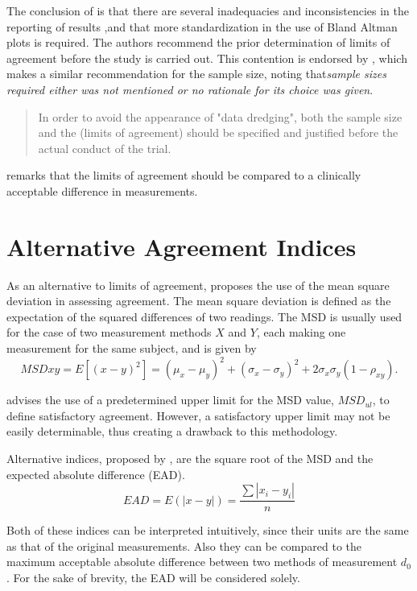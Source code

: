 \documentclass[12pt, a4paper]{report}
\theoremstyle{plain}
\theoremstyle{definition}
\theoremstyle{remark}
\begin{document}
	The conclusion of \citet{mantha} is that there are several
	inadequacies and inconsistencies in the reporting of results ,and
	that more standardization in the use of Bland Altman plots is
	required. The authors recommend the prior determination of limits
	of agreement before the study is carried out. This contention is
	endorsed by \citet{lin}, which makes a similar recommendation for
	the sample size, noting that\emph{sample sizes required either was
		not mentioned or no rationale for its choice was given}.
	
	\begin{quote}
		In order to avoid the appearance of "data dredging", both the
		sample size and the (limits of agreement) should be specified and
		justified before the actual conduct of the trial. \citep{lin}
	\end{quote}
	
	\citet{Dewitte} remarks that the limits of agreement should be
	compared to a clinically acceptable difference in measurements.
	
	\section{Alternative Agreement Indices}
	As an alternative to limits of agreement, \citet{lin2002} proposes the use of
	the mean square deviation in assessing agreement. The mean square
	deviation is defined as the expectation of the squared differences
	of two readings. The MSD is usually used for the case of two
	measurement methods $X$ and $Y$, each making one measurement for
	the same subject, and is given by
	\[
	MSDxy = E[(x - y)^2]  = (\mu_{x} - \mu_{y})^2 + (\sigma_{x} -
	\sigma_{y})^2 + 2\sigma_{x}\sigma_{y}(1-\rho_{xy}).
	\]
	
	
	\citet{Barnhart} advises the use of a predetermined upper limit
	for the MSD value, $MSD_{ul}$, to define satisfactory agreement.
	However, a satisfactory upper limit may not be easily
	determinable, thus creating a drawback to this methodology.
	
	
	Alternative indices, proposed by \citet{Barnhart}, are the square root of the MSD and the expected absolute difference (EAD). 
	\[
	EAD = E(|x - y|) = \frac{\sum |x_{i}- y_{i}|}{n}
	\]
	
	
	Both of these indices can be interpreted intuitively, since their units are the same as that of the original measurements. Also they can be compared to the maximum acceptable absolute difference between two methods of measurement $d_{0}$. For the sake of brevity, the EAD will be considered solely.
	
\end{document}
